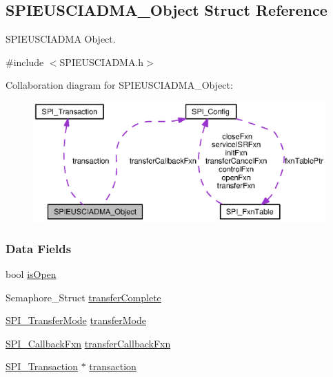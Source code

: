 \subsection{S\+P\+I\+E\+U\+S\+C\+I\+A\+D\+M\+A\+\_\+\+Object Struct Reference}
\label{struct_s_p_i_e_u_s_c_i_a_d_m_a___object}


S\+P\+I\+E\+U\+S\+C\+I\+A\+D\+M\+A Object.  




{\ttfamily \#include $<$S\+P\+I\+E\+U\+S\+C\+I\+A\+D\+M\+A.\+h$>$}



Collaboration diagram for S\+P\+I\+E\+U\+S\+C\+I\+A\+D\+M\+A\+\_\+\+Object\+:
\nopagebreak
\begin{figure}[H]
\begin{center}
\leavevmode
\includegraphics[width=350pt]{struct_s_p_i_e_u_s_c_i_a_d_m_a___object__coll__graph}
\end{center}
\end{figure}
\subsubsection*{Data Fields}
\begin{DoxyCompactItemize}
\item 
bool \hyperlink{struct_s_p_i_e_u_s_c_i_a_d_m_a___object_ad4ba79fb72b84c9e2921c2f3cd41376d}{is\+Open}
\item 
Semaphore\+\_\+\+Struct \hyperlink{struct_s_p_i_e_u_s_c_i_a_d_m_a___object_a021acd9681aee074ddb2cd09d096eaf1}{transfer\+Complete}
\item 
\hyperlink{_s_p_i_8h_ab9ea76c6529d6076eee5e1c4a5a92c6f}{S\+P\+I\+\_\+\+Transfer\+Mode} \hyperlink{struct_s_p_i_e_u_s_c_i_a_d_m_a___object_a7b0e5739357968e12886c109b465d68a}{transfer\+Mode}
\item 
\hyperlink{_s_p_i_8h_a207e2d5a7e7ea5606b6995b6485ca015}{S\+P\+I\+\_\+\+Callback\+Fxn} \hyperlink{struct_s_p_i_e_u_s_c_i_a_d_m_a___object_affae46790dac7c7f45301ec41404bfd0}{transfer\+Callback\+Fxn}
\item 
\hyperlink{struct_s_p_i___transaction}{S\+P\+I\+\_\+\+Transaction} $\ast$ \hyperlink{struct_s_p_i_e_u_s_c_i_a_d_m_a___object_af400fd7340d7319ad5334ffa9a4f0f36}{transaction}
\end{DoxyCompactItemize}


